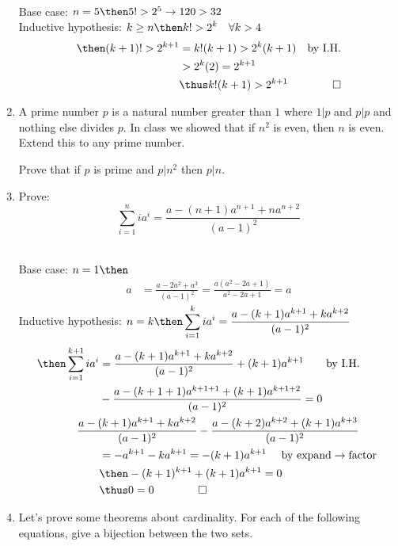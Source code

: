 \documentclass[basic, header]{nosvagor-notes}
\begin{document}
\begin{enumerate}[itemsep=4em]
    \\
    Base case: \(n = 5 \then 5! > 2^5 \to 120 > 32 \) \\
    Inductive hypothesis: \(\displaystyle
    k \geq n
    \then
    k! > 2^k \quad \forall k > 4
    \)
    \begin{align*}
      \then (k+1)! > 2^{k+1}
      &= k!(k+1) > 2^{k}(k+1)
      & \text{by I.H.} \\
      &> 2^k(2) = 2^{k+1} \\
      &\thus k!(k+1) > 2^{k+1}
      & \qed
    \end{align*}


  \item A prime number \(p\) is a natural number greater than \(1\) where
    \(1|p\) and \(p|p\) and nothing else divides \(p\). In class we showed that
    if \(n^2\) is even, then \(n\) is even. Extend this to any prime number.

    Prove that if \(p\) is prime and \(p|n^2\) then \(p|n\).

  \newpage %

  \item Prove:
    \[%
      \sum_{i=1}^{n} ia^i = \frac{a-(n+1)a^{n+1} + na^{n+2}}{(a-1)^2}
    \]%

    \\
    Base case: \(n = 1 \then\)
    \begin{align*}
     a &= \frac{a - 2a^2 + a^3}{(a-1)^2} = \frac{a(a^2 - 2a + 1)}{a^2 - 2a + 1} = a
    \end{align*}
    Inductive hypothesis: \(\displaystyle
    n=k
    \then
      \sum_{i=1}^{k} ia^i = \frac{a-(k+1)a^{k+1} + ka^{k+2}}{(a-1)^2}
     \)
    \begin{align*}
      \then
      \sum_{i=1}^{k+1} ia^i &= \frac{a-(k+1)a^{k+1} + ka^{k+2}}{(a-1)^2} + (k+1)a^{k+1}
      \qquad \text{by I.H.} \\
      &-\frac{a-(k+1+1)a^{k+1+1} + (k+1)a^{k+1+2}}{(a-1)^2} =0 \\
      &\hspace{-2em}\frac{a-(k+1)a^{k+1} + ka^{k+2}}{(a-1)^2} -
      \frac{a-(k+2)a^{k+2} + (k+1)a^{k+3}}{(a-1)^2} \\
      &= -a^{k+1} - ka^{k+1} = -(k+1)a^{k+1} \quad~\text{by expand}\to \text{factor}~\\
      &\then -(k+1)^{k+1} + (k+1)a^{k+1}  =0 \\
      &\thus 0 = 0 \qquad \qed
    \end{align*}
  \item Let’s prove some theorems about cardinality. For each of the following
    equations, give a bijection between the two sets.


\end{enumerate}
\end{document}
